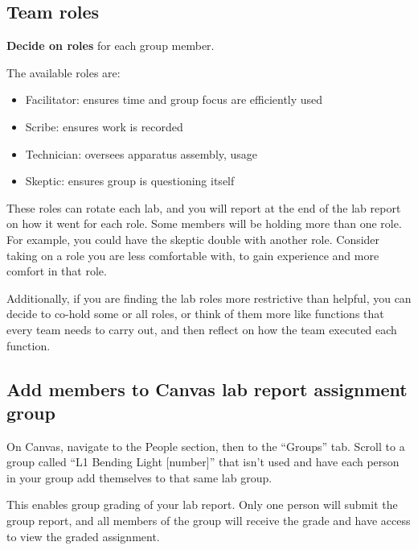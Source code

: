 \subsection{Team roles}

\begin{steps}
	\item \textbf{Decide on roles} for each group member.
\end{steps}

The available roles are:
\begin{itemize}
	\item Facilitator: ensures time and group focus are efficiently used
	\item Scribe: ensures work is recorded
	\item Technician: oversees apparatus assembly, usage
	\item Skeptic: ensures group is questioning itself
\end{itemize}

These roles can rotate each lab, and you will report at the end of the lab report on how it went for each role. Some members will be holding more than one role. For example, you could have the skeptic double with another role. Consider taking on a role you are less comfortable with, to gain experience and more comfort in that role.

Additionally, if you are finding the lab roles more restrictive than helpful, you can decide to co-hold some or all roles, or think of them more like functions that every team needs to carry out, and then reflect on how the team executed each function.

\subsection{Add members to Canvas lab report assignment group}

\begin{steps}
	\item On Canvas, navigate to the People section, then to the ``Groups'' tab. Scroll to a group called ``L1 Bending Light [number]'' that isn't used and have each person in your group add themselves to that same lab group.
\end{steps}

This enables group grading of your lab report. Only one person will submit the group report, and all members of the group will receive the grade and have access to view the graded assignment.


